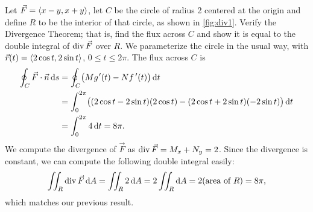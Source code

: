 \begin{example}\label{ex_div1}%
Let $\vec F =\left\langle x-y,x+y\right\rangle$, let $C$ be the circle of radius 2 centered at the origin and define $R$ to be the interior of that circle, as shown in \autoref{fig:div1}. Verify the Divergence Theorem; that is, find the flux across $C$ and show it is equal to the double integral of $\operatorname{div} \vec F$ over $R$.
\solution
We parameterize the circle in the usual way, with\\
$\vec r(t) =\left\langle 2\cos t,2\sin t\right\rangle$, $0\leq t\leq 2\pi$. The flux across $C$ is
\begin{align*}
	\oint_C \vec F\cdot \vec n\dd s
	&= \oint_C\bigl(M\gp(t)-N\fp(t)\bigr)\dd t\\
	&= \int_0^{2\pi} \bigl((2\cos t-2\sin t)(2\cos t) - (2\cos t+2\sin t)(-2\sin t)\bigr)\dd t\\
	&= \int_0^{2\pi} 4\dd t = 8\pi.
\end{align*}
We compute the divergence of $\vec F$ as $\operatorname{div} \vec F = M_x+N_y = 2$. Since the divergence is constant, we can compute the following double integral easily:
\[
\iint_R \operatorname{div} \vec F\operatorname{d}\! A = \iint_R 2\operatorname{d}\! A = 2\iint_R\operatorname{d}\! A
= 2(\text{area of $R$}) = 8\pi,
\]
which matches our previous result.
\end{example}

